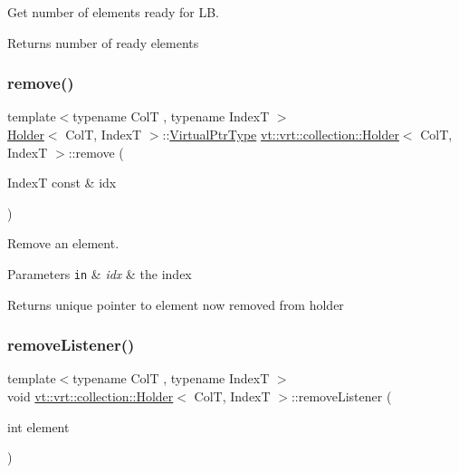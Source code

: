 Get number of elements ready for LB. 

\begin{DoxyReturn}{Returns}
number of ready elements 
\end{DoxyReturn}
\mbox{\label{structvt_1_1vrt_1_1collection_1_1_holder_ae2cd807c3b44832151b7f7d05a07e879}} 
\subsubsection{\texorpdfstring{remove()}{remove()}}
{\footnotesize\ttfamily template$<$typename ColT , typename IndexT $>$ \\
\hyperlink{structvt_1_1vrt_1_1collection_1_1_holder}{Holder}$<$ ColT, IndexT $>$\+::\hyperlink{structvt_1_1vrt_1_1collection_1_1_holder_a04ba57a7b2c48ce6b4c90d3f3b33f43c}{Virtual\+Ptr\+Type} \hyperlink{structvt_1_1vrt_1_1collection_1_1_holder}{vt\+::vrt\+::collection\+::\+Holder}$<$ ColT, IndexT $>$\+::remove (\begin{DoxyParamCaption}\item[{IndexT const \&}]{idx }\end{DoxyParamCaption})}



Remove an element. 


\begin{DoxyParams}[1]{Parameters}
\mbox{\tt in}  & {\em idx} & the index\\
\hline
\end{DoxyParams}
\begin{DoxyReturn}{Returns}
unique pointer to element now removed from holder 
\end{DoxyReturn}
\mbox{\label{structvt_1_1vrt_1_1collection_1_1_holder_ae54e9da47ea76dc7f6bb4cd12a135209}} 
\subsubsection{\texorpdfstring{remove\+Listener()}{removeListener()}}
{\footnotesize\ttfamily template$<$typename ColT , typename IndexT $>$ \\
void \hyperlink{structvt_1_1vrt_1_1collection_1_1_holder}{vt\+::vrt\+::collection\+::\+Holder}$<$ ColT, IndexT $>$\+::remove\+Listener (\begin{DoxyParamCaption}\item[{int}]{element }\end{DoxyParamCaption})}



